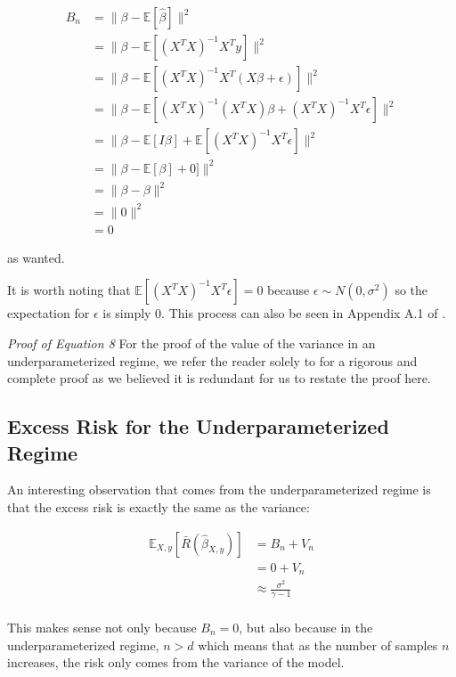 \documentclass{article}
\begin{document}
\begin{align*}
    B_n &= \|\beta - \mathbb{E}[\hat{\beta}]\|^2\\
    &= \|\beta - \mathbb{E}[(X^{T}X)^{-1}X^{T}y]\|^2\\
    &= \|\beta -  \mathbb{E} [(X^{T}X)^{-1}X^{T} (X\beta + \epsilon)]\|^2\\
    &= \|\beta - \mathbb{E} [(X^{T}X)^{-1}(X^{T}X)\beta + (X^{T}X)^{-1}X^{T}\epsilon]\|^2\\
    &= \|\beta - \mathbb{E}[I\beta] + \mathbb{E} [(X^{T}X)^{-1}X^{T}\epsilon]\|^2\\
    &= \|\beta - \mathbb{E}[\beta] + 0]\|^2\\
    &= \|\beta - \beta\|^2\\
    &= \|0\|^2\\
    &= 0
\end{align*}

as wanted.

It is worth noting that $\mathbb{E} [(X^{T}X)^{-1}X^{T}\epsilon] = 0$ because $\epsilon \sim N(0, \sigma^2)$ so the expectation for $\epsilon$ is simply 0. This process can also be seen in Appendix A.1 of \cite{Nakkiran_2019}.

\emph{Proof of Equation 8}
For the proof of the value of the variance in an underparameterized regime, we refer the reader solely to \cite{Hastie_2022} for a rigorous and complete proof as we believed it is redundant for us to restate the proof here.

\subsection{Excess Risk for the Underparameterized Regime}

An interesting observation that comes from the underparameterized regime is that the excess risk is exactly the same as the variance:

\begin{align*}
    \mathbb{E}_{X,y} [\bar{R} (\hat{\beta}_{X,y})] &= B_n + V_n\\
    &= 0 + V_n\\
    &\approx \frac{\sigma^2}{\gamma - 1}\\
\end{align*}

This makes sense not only because $B_n = 0$, but also because in the underparameterized regime, $n>d$ which means that as the number of samples $n$ increases, the risk only comes from the variance of the model. 
\end{document}

